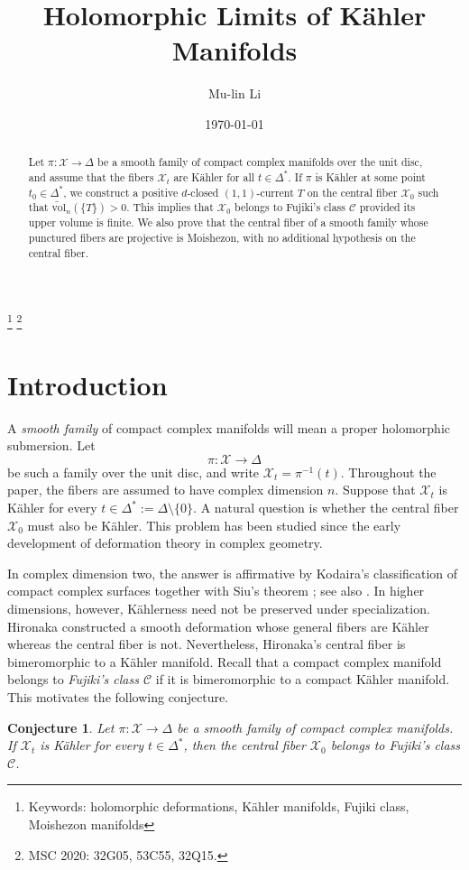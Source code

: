 \documentclass[11pt,letterpaper]{amsart}
\numberwithin{equation}{section}
\newcommand{\cal}{\mathcal}
\def\cX{{\cal X}}
\newtheorem{conj}[prop]{Conjecture}
\begin{document}
\title{Holomorphic Limits of K\"ahler Manifolds}

\author{Mu-lin Li}
\address{School of Mathematics, Hunan University, China}

\thanks{Keywords: holomorphic deformations, K\"ahler manifolds, Fujiki class, Moishezon manifolds}
\thanks{MSC 2020: 32G05, 53C55, 32Q15.}

\date{\today}

\begin{abstract}
Let $\pi:\cX\to\Delta$ be a smooth family of compact complex manifolds over the unit disc, and assume that the fibers $\cX_t$ are K\"ahler for all $t\in\Delta^*$. If $\pi$ is K\"ahler at some point $t_0\in\Delta^*$, we construct a positive $d$-closed $(1,1)$-current $T$ on the central fiber $\cX_0$ such that $\widetilde{\mathrm{vol}}_n(\{T\})>0$. This implies that $\cX_0$ belongs to Fujiki's class $\mathcal C$ provided its upper volume is finite. We also prove that the central fiber of a smooth family whose punctured fibers are projective is Moishezon, with no additional hypothesis on the central fiber.
\end{abstract}
\maketitle

\section{Introduction}

A \emph{smooth family} of compact complex manifolds will mean a proper holomorphic submersion. Let
\[
 \pi:\cX\to\Delta
\]
be such a family over the unit disc, and write $\cX_t=\pi^{-1}(t)$. Throughout the paper, the fibers are assumed to have complex dimension $n$. Suppose that $\cX_t$ is K\"ahler for every $t\in\Delta^*:=\Delta\setminus\{0\}$. A natural question is whether the central fiber $\cX_0$ must also be K\"ahler. This problem has been studied since the early development of deformation theory in complex geometry.

In complex dimension two, the answer is affirmative by Kodaira's classification of compact complex surfaces together with Siu's theorem \cite{Si83}; see also \cite{Bu,Lm99}. In higher dimensions, however, K\"ahlerness need not be preserved under specialization. Hironaka constructed a smooth deformation \cite{Hi62} whose general fibers are K\"ahler whereas the central fiber is not. Nevertheless, Hironaka's central fiber is bimeromorphic to a K\"ahler manifold. Recall that a compact complex manifold belongs to \emph{Fujiki's class $\mathcal C$} if it is bimeromorphic to a compact K\"ahler manifold. This motivates the following conjecture.
\begin{conj}\label{Fujiki}
Let $\pi:\cX\to\Delta$ be a smooth family of compact complex manifolds. If $\cX_t$ is K\"ahler for every $t\in\Delta^*$, then the central fiber $\cX_0$ belongs to Fujiki's class $\mathcal C$.
\end{conj}
\end{document}
